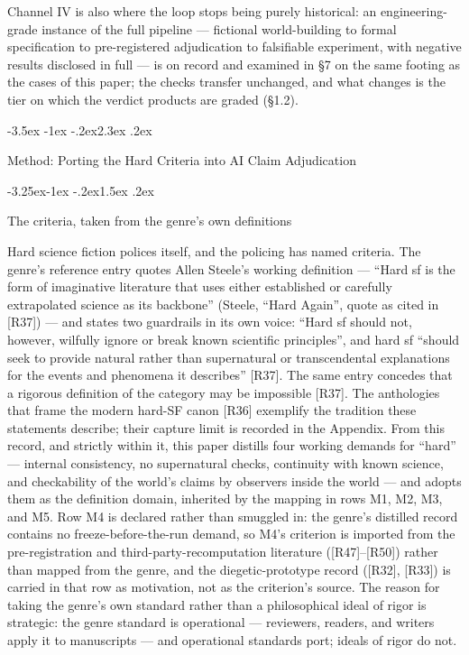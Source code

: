 \documentclass[11pt,a4paper]{article}
\makeatletter
\renewcommand\section{\@startsection{section}{1}{\z@}%
  {-3.5ex \@plus -1ex \@minus -.2ex}{2.3ex \@plus .2ex}%
  {\normalfont\Large\bfseries\raggedright}}
\renewcommand\subsection{\@startsection{subsection}{2}{\z@}%
  {-3.25ex\@plus -1ex \@minus -.2ex}{1.5ex \@plus .2ex}%
  {\normalfont\large\bfseries\raggedright}}
\makeatother
\begin{document}
Channel IV is also where the loop stops being purely historical: an engineering-grade instance of the full pipeline — fictional world-building to formal specification to pre-registered adjudication to falsifiable experiment, with negative results disclosed in full — is on record and examined in §7 on the same footing as the cases of this paper; the checks transfer unchanged, and what changes is the tier on which the verdict products are graded (§1.2).

\section{Method: Porting the Hard Criteria into AI Claim Adjudication}

\subsection{The criteria, taken from the genre's own definitions}

Hard science fiction polices itself, and the policing has named criteria. The genre's reference entry quotes Allen Steele's working definition — ``Hard sf is the form of imaginative literature that uses either established or carefully extrapolated science as its backbone'' (Steele, ``Hard Again'', quote as cited in [R37]) — and states two guardrails in its own voice: ``Hard sf should not, however, wilfully ignore or break known scientific principles'', and hard sf ``should seek to provide natural rather than supernatural or transcendental explanations for the events and phenomena it describes'' [R37]. The same entry concedes that a rigorous definition of the category may be impossible [R37]. The anthologies that frame the modern hard-SF canon [R36] exemplify the tradition these statements describe; their capture limit is recorded in the Appendix. From this record, and strictly within it, this paper distills four working demands for ``hard'' — internal consistency, no supernatural checks, continuity with known science, and checkability of the world's claims by observers inside the world — and adopts them as the definition domain, inherited by the mapping in rows M1, M2, M3, and M5. Row M4 is declared rather than smuggled in: the genre's distilled record contains no freeze-before-the-run demand, so M4's criterion is imported from the pre-registration and third-party-recomputation literature ([R47]–[R50]) rather than mapped from the genre, and the diegetic-prototype record ([R32], [R33]) is carried in that row as motivation, not as the criterion's source. The reason for taking the genre's own standard rather than a philosophical ideal of rigor is strategic: the genre standard is operational — reviewers, readers, and writers apply it to manuscripts — and operational standards port; ideals of rigor do not.
\end{document}
